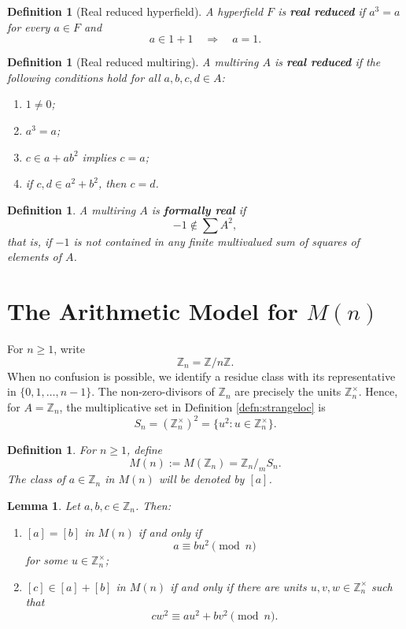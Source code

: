 \documentclass[a4paper,10pt]{article}
\newtheorem{lem}[teo]{Lemma} %
\newtheorem{defn}[teo]{Definition}
\newcommand{\cl}[1]{\left[#1\right]}
\begin{document}
\begin{defn}[Real reduced hyperfield]\label{defn:mfrealreduced}
A hyperfield $F$ is \textbf{real reduced} if $a^3=a$ for every $a\in F$ and
\[
        a\in1+1\quad\Longrightarrow\quad a=1.
\]
\end{defn}

\begin{defn}[Real reduced multiring]\label{defn:mrrealreduced}
A multiring $A$ is \textbf{real reduced} if the following conditions hold for all $a,b,c,d\in A$:
\begin{enumerate}[i -]
    \item $1\ne0$;
    \item $a^3=a$;
    \item $c\in a+ab^2$ implies $c=a$;
    \item if $c,d\in a^2+b^2$, then $c=d$.
\end{enumerate}
\end{defn}

\begin{defn}\label{defn:formally-real}
A multiring $A$ is \textbf{formally real} if
\[
        -1\notin \sum A^2,
\]
that is, if $-1$ is not contained in any finite multivalued sum of squares of elements of $A$.
\end{defn}

\section{The Arithmetic Model for $M(n)$}\label{arithmetic-section}

For $n\ge1$, write
\[
        \mathbb Z_n=\mathbb Z/n\mathbb Z.
\]
When no confusion is possible, we identify a residue class with its representative in $\{0,1,\ldots,n-1\}$.  The non-zero-divisors of $\mathbb Z_n$ are precisely the units $\mathbb Z_n^\times$.  Hence, for $A=\mathbb Z_n$, the multiplicative set in Definition \ref{defn:strangeloc} is
\[
        S_n=(\mathbb Z_n^\times)^2=\{u^2:u\in\mathbb Z_n^\times\}.
\]

\begin{defn}\label{defn:Mn}
For $n\ge1$, define
\[
        M(n):=M(\mathbb Z_n)=\mathbb Z_n/_m S_n.
\]
The class of $a\in\mathbb Z_n$ in $M(n)$ will be denoted by $\cl a$.
\end{defn}

\begin{lem}\label{lem:basic-description}
Let $a,b,c\in\mathbb Z_n$.  Then:
\begin{enumerate}[i -]
    \item $\cl a=\cl b$ in $M(n)$ if and only if
    \[
        a\equiv bu^2\pmod n
    \]
    for some $u\in\mathbb Z_n^\times$;
    \item $\cl c\in\cl a+\cl b$ in $M(n)$ if and only if there are units $u,v,w\in\mathbb Z_n^\times$ such that
    \[
        cw^2\equiv au^2+bv^2\pmod n.
    \]
\end{enumerate}
\end{lem}
\end{document}
